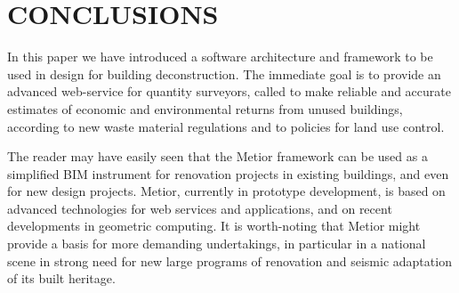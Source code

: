 \documentclass[a4paper,twoside]{article}
\begin{document}
%
\section{\uppercase{Conclusions}}
\label{sec:conclusion}

\noindent
In this paper we have introduced a software architecture and framework to be used in  design for building deconstruction. The immediate goal is to provide an advanced web-service for quantity surveyors, called  to make reliable and accurate estimates of economic and environmental returns from unused buildings, according to new waste material regulations and to policies for land use control. 

The reader may have easily seen that the Metior framework can be used as a simplified BIM instrument for renovation projects in existing buildings, and even for new design projects.  Metior, currently in prototype development, is based on advanced technologies for web services and applications, and on recent developments in geometric computing. 
It is worth-noting that Metior might provide a basis for more demanding undertakings, in particular in a national scene in strong need for new large programs of renovation and seismic adaptation of its built heritage.




{\small
}
\end{document}

